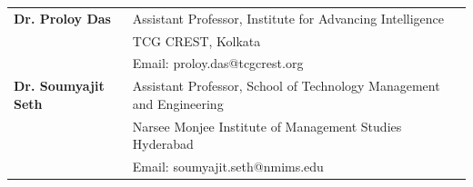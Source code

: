 \begin{longtable}[l]{@{} m{3.75cm} m{13.5cm}}
\textbf{Dr. Proloy Das} & Assistant Professor, Institute for Advancing Intelligence\\
&  TCG CREST, Kolkata\\
& Email: \textcolor{linkblue}{proloy.das@tcgcrest.org}\\[0.2cm]

\textbf{Dr. Soumyajit Seth} & Assistant Professor, School of Technology Management and Engineering\\
& Narsee Monjee Institute of Management Studies Hyderabad\\
& Email: \textcolor{linkblue}{soumyajit.seth@nmims.edu}\\[0.2cm]
\end{longtable}